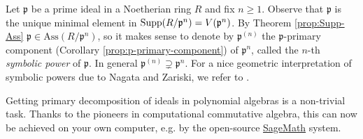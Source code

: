 \begin{example}
	Let $\mathfrak{p}$ be a prime ideal in a Noetherian ring $R$ and fix $n \geq 1$. Observe that $\mathfrak{p}$ is the unique minimal element in $\operatorname{Supp}(R/\mathfrak{p}^n) = V(\mathfrak{p}^n)$. By Theorem \ref{prop:Supp-Ass} $\mathfrak{p} \in \text{Ass}(R/\mathfrak{p}^n)$, so it makes sense to denote by $\mathfrak{p}^{(n)}$ the $\mathfrak{p}$-primary component (Corollary \ref{prop:p-primary-component}) of $\mathfrak{p}^n$, called the $n$-th \emph{symbolic power} of $\mathfrak{p}$. In general $\mathfrak{p}^{(n)} \supsetneq \mathfrak{p}^n$. For a nice geometric interpretation of symbolic powers due to Nagata and Zariski, we refer to \cite[\S 3.9]{Eis95}.
\end{example}

Getting primary decomposition of ideals in polynomial algebras is a non-trivial task. Thanks to the pioneers in computational commutative algebra, this can now be achieved on your own computer, e.g. by the open-source \href{http://www.sagemath.org}{SageMath} system.
